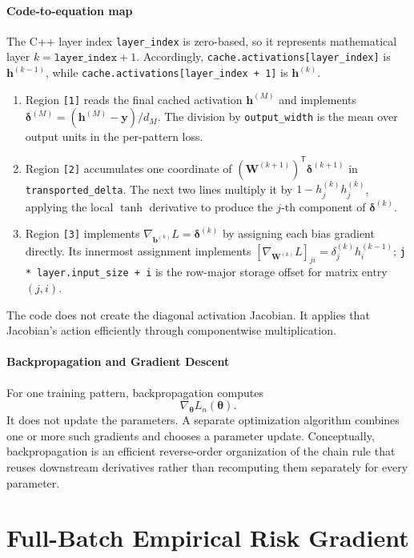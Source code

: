 \documentclass{article}
\begin{document}
\paragraph{Code-to-equation map}
The C++ layer index \texttt{layer\_index} is zero-based, so it
represents mathematical layer \(k=\texttt{layer\_index}+1\).
Accordingly, \texttt{cache.activations[layer\_index]} is
\(\mathbf{h}^{(k-1)}\), while
\texttt{cache.activations[layer\_index + 1]} is \(\mathbf{h}^{(k)}\).
\begin{enumerate}
  \item Region \texttt{[1]} reads the final cached activation
  \(\mathbf{h}^{(M)}\) and implements
  \(\boldsymbol{\delta}^{(M)}
  =(\mathbf{h}^{(M)}-\mathbf{y})/d_M\). The division by
  \texttt{output\_width} is the mean over output units in the
  per-pattern loss.
  \item Region \texttt{[2]} accumulates one coordinate of
  \((\mathbf{W}^{(k+1)})^\mathsf{T}
  \boldsymbol{\delta}^{(k+1)}\) in \texttt{transported\_delta}. The
  next two lines multiply it by
  \(1-h_j^{(k)}h_j^{(k)}\), applying the local \(\tanh\) derivative to
  produce the \(j\)-th component of
  \(\boldsymbol{\delta}^{(k)}\).
  \item Region \texttt{[3]} implements
  \(\nabla_{\mathbf{b}^{(k)}}L=\boldsymbol{\delta}^{(k)}\) by assigning
  each bias gradient directly. Its innermost assignment implements
  \([\nabla_{\mathbf{W}^{(k)}}L]_{ji}
  =\delta_j^{(k)}h_i^{(k-1)}\);
  \texttt{j * layer.input\_size + i} is the row-major storage offset for
  matrix entry \((j,i)\).
\end{enumerate}
The code does not create the diagonal activation Jacobian. It applies
that Jacobian's action efficiently through componentwise multiplication.

\paragraph{Backpropagation and Gradient Descent}
For one training pattern, backpropagation computes
\[
  \nabla_{\boldsymbol\theta}L_n(\boldsymbol\theta).
\]
It does not update the parameters. A separate optimization algorithm
combines one or more such gradients and chooses a parameter update.
Conceptually, backpropagation is an efficient reverse-order organization
of the chain rule that reuses downstream derivatives rather than
recomputing them separately for every parameter.

\section{Full-Batch Empirical Risk Gradient}
\end{document}
